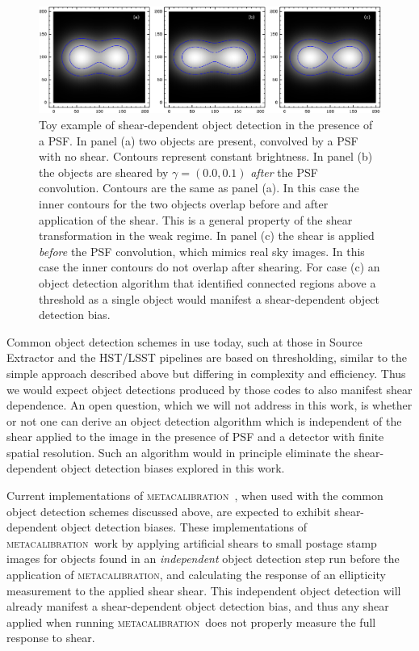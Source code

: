 \documentclass[fleqn,useAMS,usenatbib]{mnras}
\newcommand{\mcal}{\textsc{metacalibration}}
\begin{document}
\begin{figure}
  \includegraphics[width=\textwidth]{figures/toy.png}

  \caption{ Toy example of shear-dependent object detection in the presence of a
  PSF.  In panel (a) two objects are present, convolved by a PSF with no
  shear.  Contours represent constant brightness.  In panel (b) the objects
  are sheared by $\gamma = (0.0, 0.1)$ {\em after} the PSF convolution.
  Contours are the same as panel (a).  In this case the inner contours for
  the two objects overlap before and after application of the shear.  This is
  a general property of the shear transformation in the weak regime. In panel
  (c) the shear is applied {\em before} the PSF convolution, which mimics real
  sky images. In this case the inner contours do not overlap after shearing.
  For case (c) an object detection algorithm that identified connected regions above
  a threshold as a single object would manifest a shear-dependent object detection
  bias.  \label{fig:toy} }

\end{figure}

Common object detection schemes in use today, such at those in Source Extractor
\citep{Bertin96} and the HST/LSST pipelines \citep{BoschHSC2018,BoschLSST2018}
are based on thresholding, similar to the simple approach described above but
differing in complexity and efficiency. Thus we would expect object detections
produced by those codes to also manifest shear dependence. An open question,
which we will not address in this work, is whether or not one can derive an
object detection algorithm which is independent of the shear applied to the
image in the presence of PSF and a detector with finite spatial resolution.
Such an algorithm would in principle eliminate the shear-dependent object
detection biases explored in this work.

Current implementations of \mcal\
\citep[e.g.,][]{HuffMcal2017,SheldonMcal2017}, when used with the common object
detection schemes discussed above, are expected to exhibit shear-dependent
object detection biases. These implementations of \mcal\ work by applying
artificial shears to small postage stamp images for objects found in an {\em
independent} object detection step run before the application of \mcal, and
calculating the response of an ellipticity measurement to the applied shear
shear. This independent object detection will already manifest a
shear-dependent object detection bias, and thus any shear applied when running
\mcal\ does not properly measure the full response to shear.
\end{document}
